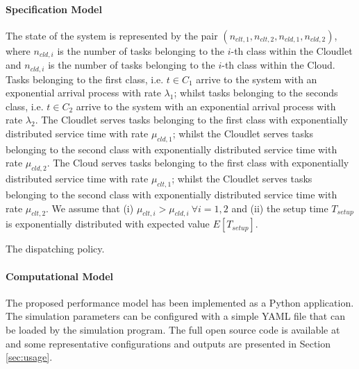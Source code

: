 \paragraph{Specification Model}
The state of the system is represented by the pair $(n_{clt,1},n_{clt,2},n_{cld,1},n_{cld,2})$, where $n_{cld,i}$ is the number of tasks belonging to the $i$-th class within the Cloudlet and $n_{cld,i}$ is the number of tasks belonging to the $i$-th class within the Cloud.
Tasks belonging to the first class, i.e. $t\in C_{1}$ arrive to the system with an exponential arrival process with rate $ \lambda_{1}$; whilst tasks belonging to the seconds class, i.e. $t\in C_{2}$ arrive to the system with an exponential arrival process with rate $ \lambda_{2}$.
The Cloudlet serves tasks belonging to the first class with exponentially distributed service time with rate $\mu_{cld,1}$; whilst the Cloudlet serves tasks belonging to the second class with exponentially distributed service time with rate $\mu_{cld,2}$.
The Cloud serves tasks belonging to the first class with exponentially distributed service time with rate $\mu_{clt,1}$; whilst the Cloudlet serves tasks belonging to the second class with exponentially distributed service time with rate $\mu_{clt,2}$.
We assume that 
(i) $\mu_{clt,i}>\mu_{cld,i}\ \forall i=1,2$ and
(ii) the setup time $T_{setup}$ is exponentially distributed with expected value $E[T_{setup}]$.

\begin{algorithm}
	\label{alg:modeling-dispatching-policy}
	\SetAlgoLined
\caption{The dispatching policy.}
\end{algorithm}

\paragraph{Computational Model}
The proposed performance model has been implemented as a Python application. 
The simulation parameters can be configured with a simple YAML file that can be loaded by the simulation program.
The full open source code is available at \cite{gmarciani-demule} and some representative configurations and outputs are presented in Section \ref{sec:usage}.

